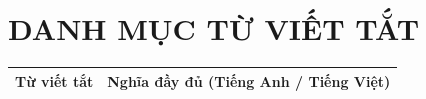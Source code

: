 \newpage
\section*{DANH MỤC TỪ VIẾT TẮT}

\begingroup
\renewcommand{\arraystretch}{1.3}

\begin{longtable}{@{} p{2.5cm} p{12.5cm} @{}}
    \textbf{Từ viết tắt} & \textbf{Nghĩa đầy đủ (Tiếng Anh / Tiếng Việt)} \\
    \hline
    \endhead %


\end{longtable}
